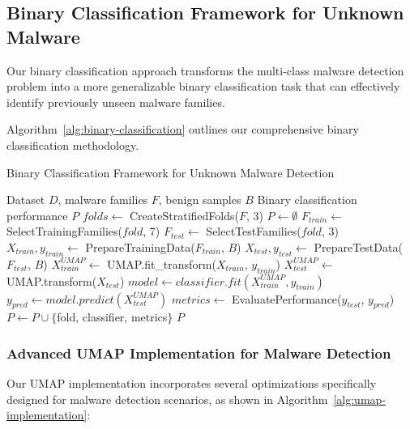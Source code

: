 \subsection{Binary Classification Framework for Unknown Malware}
\label{subsec:binary-classification}

Our binary classification approach transforms the multi-class malware detection problem into a more generalizable binary classification task that can effectively identify previously unseen malware families.

Algorithm~\ref{alg:binary-classification} outlines our comprehensive binary classification methodology.

\begin{algorithm}[!htbp]
\caption{Binary Classification Framework for Unknown Malware Detection}
\label{alg:binary-classification}
\begin{algorithmic}[1]
\Require Dataset $D$, malware families $F$, benign samples $B$
\Ensure Binary classification performance $P$
\State $folds \leftarrow$ CreateStratifiedFolds($F$, 3) 
\State $P \leftarrow \emptyset$
    \State $F_{train} \leftarrow$ SelectTrainingFamilies($fold$, 7) 
    \State $F_{test} \leftarrow$ SelectTestFamilies($fold$, 3) 
    \State $X_{train}, y_{train} \leftarrow$ PrepareTrainingData($F_{train}$, $B$)
    \State $X_{test}, y_{test} \leftarrow$ PrepareTestData($F_{test}$, $B$)
    \State $X_{train}^{UMAP} \leftarrow$ UMAP.fit\_transform($X_{train}$, $y_{train}$)
    \State $X_{test}^{UMAP} \leftarrow$ UMAP.transform($X_{test}$)
        \State $model \leftarrow classifier.fit(X_{train}^{UMAP}, y_{train})$
        \State $y_{pred} \leftarrow model.predict(X_{test}^{UMAP})$
        \State $metrics \leftarrow$ EvaluatePerformance($y_{test}$, $y_{pred}$)
        \State $P \leftarrow P \cup \{$fold, classifier, metrics$\}$
    \EndFor
\EndFor
\Return $P$
\end{algorithmic}
\end{algorithm}

\subsubsection{Advanced UMAP Implementation for Malware Detection}

Our UMAP implementation incorporates several optimizations specifically designed for malware detection scenarios, as shown in Algorithm~\ref{alg:umap-implementation}:

